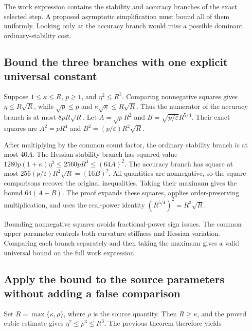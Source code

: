 \documentclass[11pt,a4paper]{report}
\begin{document}
The work expression contains the stability and accuracy branches of the exact selected step. A proposed asymptotic simplification must bound all of them uniformly. Looking only at the accuracy branch would miss a possible dominant ordinary-stability cost.

\subsection{\texorpdfstring{Bound the three branches with one explicit universal constant}{Bound the three branches with one explicit universal constant}}
\label{report-step-KineticLangevin-ConditionNumber-lean-4}


Suppose \(1\le\kappa\le R\), \(p\ge1\), and \(\eta^2\le R^3\). Comparing nonnegative squares gives \(\eta\le R\sqrt R\), while \(\sqrt p\le p\) and \(\kappa\sqrt\kappa\le R\sqrt R\). Thus the numerator of the accuracy branch is at most \(8pR\sqrt R\). Let \(A=\sqrt pR^2\) and \(B=\sqrt{p/\varepsilon}R^{5/4}\). Their exact squares are \(A^2=pR^4\) and \(B^2=(p/\varepsilon)R^2\sqrt R\).



After multiplying by the common count factor, the ordinary stability branch is at most \(40A\). The Hessian stability branch has squared value \(1280p(1+\kappa)\eta^2\le2560pR^4\le(64A)^2\). The accuracy branch has square at most \(256(p/\varepsilon)R^2\sqrt R=(16B)^2\). All quantities are nonnegative, so the square comparisons recover the original inequalities. Taking their maximum gives the bound \(64(A+B)\). The proof expands these squares, applies order-preserving multiplication, and uses the real-power identity \((R^{5/4})^2=R^2\sqrt R\).



Bounding nonnegative squares avoids fractional-power sign issues. The common upper parameter controls both curvature stiffness and Hessian variation. Comparing each branch separately and then taking the maximum gives a valid universal bound on the full work expression.

\subsection{\texorpdfstring{Apply the bound to the source parameters without adding a false comparison}{Apply the bound to the source parameters without adding a false comparison}}
\label{report-step-KineticLangevin-ConditionNumber-lean-5}


Set \(R=\max\{\kappa,\rho\}\), where \(\rho\) is the source quantity. Then \(R\ge\kappa\), and the proved cubic estimate gives \(\eta^2\le\rho^3\le R^3\). The previous theorem therefore yields
\end{document}
